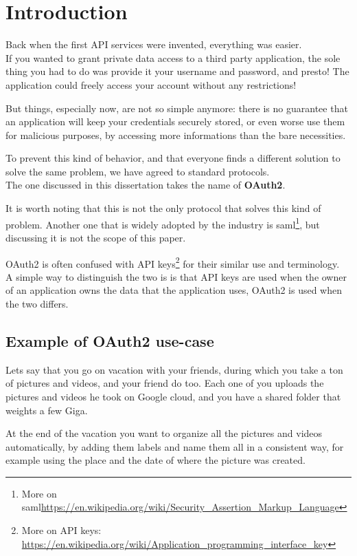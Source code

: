 \section{Introduction}
Back when the first API services were invented, everything was easier.
\\
If you wanted to grant private data access to a third party application,
the sole thing you had to do was provide it your username and password, and
presto!
The application could freely access your account without any restrictions!

But things, especially now, are not so simple anymore: there is no guarantee
that an application will keep your credentials securely stored, or even worse
use them for malicious purposes, by accessing more informations than the bare
necessities.

To prevent this kind of behavior, and that everyone finds a different solution
to solve the same problem, we have agreed to standard protocols.
\\
The one discussed in this dissertation takes the name of \textbf{OAuth2}.

It is worth noting that this is not the only protocol that solves this kind of problem.
Another one that is widely adopted by the industry is \acs{saml}\footnote{More on \acs{saml}\url{https://en.wikipedia.org/wiki/Security_Assertion_Markup_Language}}, but discussing it is not the scope of this paper.


OAuth2 is often confused with API keys\footnote{More on API keys:
\url{https://en.wikipedia.org/wiki/Application\_programming\_interface\_key}}
%
for their similar use and terminology.
\\
A simple way to distinguish the two is
is that API keys are used when the owner of an application owns the data that
the application uses, OAuth2 is used when the two differs.

\subsection{Example of OAuth2 use-case}

Lets say that you go on vacation with your friends, during which you take a ton
of pictures and videos, and your friend do too.
Each one of you uploads the pictures and videos he took on Google cloud, and
you have a shared folder that weights a few Giga.

At the end of the vacation you want to organize all the pictures and videos
automatically, by adding them labels and name them all in a consistent way, for
example using the place and the date of where the picture was created.

